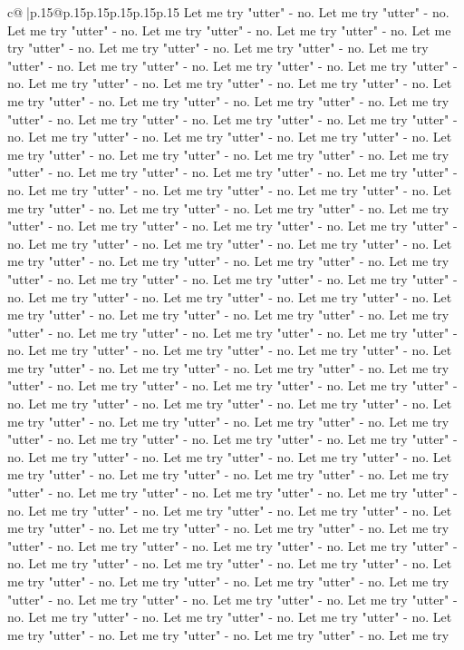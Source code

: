\documentclass{article}
\begin{document}
{\begin{supertabular}{c@{$\;$}|p{.15\linewidth}@{}p{.15\linewidth}p{.15\linewidth}p{.15\linewidth}p{.15\linewidth}p{.15\linewidth}}
{{{Let me try "utter" {-} no. Let me try "utter" {-} no. Let me try "utter" {-} no. Let me try "utter" {-} no. Let me try "utter" {-} no. Let me try "utter" {-} no. Let me try "utter" {-} no. Let me try "utter" {-} no. Let me try "utter" {-} no. Let me try "utter" {-} no. Let me try "utter" {-} no. Let me try "utter" {-} no. Let me try "utter" {-} no. Let me try "utter" {-} no. Let me try "utter" {-} no. Let me try "utter" {-} no. Let me try "utter" {-} no. Let me try "utter" {-} no. Let me try "utter" {-} no. Let me try "utter" {-} no. Let me try "utter" {-} no. Let me try "utter" {-} no. Let me try "utter" {-} no. Let me try "utter" {-} no. Let me try "utter" {-} no. Let me try "utter" {-} no. Let me try "utter" {-} no. Let me try "utter" {-} no. Let me try "utter" {-} no. Let me try "utter" {-} no. Let me try "utter" {-} no. Let me try "utter" {-} no. Let me try "utter" {-} no. Let me try "utter" {-} no. Let me try "utter" {-} no. Let me try "utter" {-} no. Let me try "utter" {-} no. Let me try "utter" {-} no. Let me try "utter" {-} no. Let me try "utter" {-} no. Let me try "utter" {-} no. Let me try "utter" {-} no. Let me try "utter" {-} no. Let me try "utter" {-} no. Let me try "utter" {-} no. Let me try "utter" {-} no. Let me try "utter" {-} no. Let me try "utter" {-} no. Let me try "utter" {-} no. Let me try "utter" {-} no. Let me try "utter" {-} no. Let me try "utter" {-} no. Let me try "utter" {-} no. Let me try "utter" {-} no. Let me try "utter" {-} no. Let me try "utter" {-} no. Let me try "utter" {-} no. Let me try "utter" {-} no. Let me try "utter" {-} no. Let me try "utter" {-} no. Let me try "utter" {-} no. Let me try "utter" {-} no. Let me try "utter" {-} no. Let me try "utter" {-} no. Let me try "utter" {-} no. Let me try "utter" {-} no. Let me try "utter" {-} no. Let me try "utter" {-} no. Let me try "utter" {-} no. Let me try "utter" {-} no. Let me try "utter" {-} no. Let me try "utter" {-} no. Let me try "utter" {-} no. Let me try "utter" {-} no. Let me try "utter" {-} no. Let me try "utter" {-} no. Let me try "utter" {-} no. Let me try "utter" {-} no. Let me try "utter" {-} no. Let me try "utter" {-} no. Let me try "utter" {-} no. Let me try "utter" {-} no. Let me try "utter" {-} no. Let me try "utter" {-} no. Let me try "utter" {-} no. Let me try "utter" {-} no. Let me try "utter" {-} no. Let me try "utter" {-} no. Let me try "utter" {-} no. Let me try "utter" {-} no. Let me try "utter" {-} no. Let me try "utter" {-} no. Let me try "utter" {-} no. Let me try "utter" {-} no. Let me try "utter" {-} no. Let me try "utter" {-} no. Let me try "utter" {-} no. Let me try "utter" {-} no. Let me try "utter" {-} no. Let me try "utter" {-} no. Let me try "utter" {-} no. Let me try "utter" {-} no. Let me try "utter" {-} no. Let me try "utter" {-} no. Let me try "utter" {-} no. Let me try "utter" {-} no. Let me try "utter" {-} no. Let me try "utter" {-} no. Let me try "utter" {-} no. Let me try "utter" {-} no. Let me try "utter" {-} no. Let me try "utter" {-} no. Let me try "utter" {-} no. Let me try "utter" {-} no. Let me try "utter" {-} no. Let me try "utter" {-} no. Let me try "utter" {-} no. Let me try "utter" {-} no. Let me try }}}
\end{supertabular}}
\end{document}
